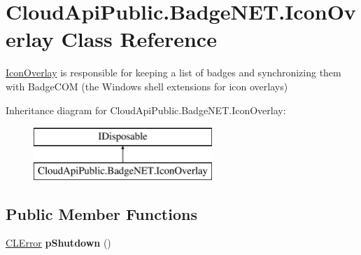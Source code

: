 \hypertarget{class_cloud_api_public_1_1_badge_n_e_t_1_1_icon_overlay}{\section{Cloud\-Api\-Public.\-Badge\-N\-E\-T.\-Icon\-Overlay Class Reference}
\label{class_cloud_api_public_1_1_badge_n_e_t_1_1_icon_overlay}
}


\hyperlink{class_cloud_api_public_1_1_badge_n_e_t_1_1_icon_overlay}{Icon\-Overlay} is responsible for keeping a list of badges and synchronizing them with Badge\-C\-O\-M (the Windows shell extensions for icon overlays)  


Inheritance diagram for Cloud\-Api\-Public.\-Badge\-N\-E\-T.\-Icon\-Overlay\-:\begin{figure}[H]
\begin{center}
\leavevmode
\includegraphics[height=2.000000cm]{class_cloud_api_public_1_1_badge_n_e_t_1_1_icon_overlay}
\end{center}
\end{figure}
\subsection*{Public Member Functions}
\begin{DoxyCompactItemize}
\item 
\hypertarget{class_cloud_api_public_1_1_badge_n_e_t_1_1_icon_overlay_a7119d27992df785f47d557e14d5e9b23}{\hyperlink{class_cloud_api_public_1_1_model_1_1_c_l_error}{C\-L\-Error} {\bfseries p\-Shutdown} ()}\label{class_cloud_api_public_1_1_badge_n_e_t_1_1_icon_overlay_a7119d27992df785f47d557e14d5e9b23}

\end{DoxyCompactItemize}
